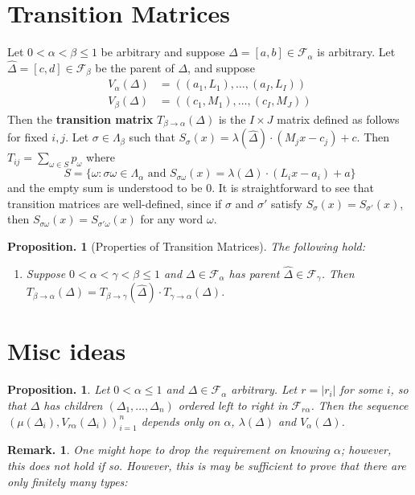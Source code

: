 \documentclass[11pt, a4paper]{memoir}
\theoremstyle{change}
\newtheorem{proposition}[theorem]{Proposition.}
\theoremstyle{plain}
\theoremstyle{nonumberplain}
\newtheorem{remark}{Remark.}
\numberwithin{equation}{section}
\begin{document}
\section{Transition Matrices}
Let $0<\alpha<\beta\leq 1$ be arbitrary and suppose $\Delta=[a,b]\in\mathcal{F}_\alpha$ is arbitrary.
Let $\widehat\Delta=[c,d]\in\mathcal{F}_\beta$ be the parent of $\Delta$, and suppose
\begin{align*}
    V_\alpha(\Delta) &= ((a_1,L_1),\ldots,(a_I,L_I))\\
    V_\beta(\Delta) &= ((c_1,M_1),\ldots,(c_I,M_J))
\end{align*}
Then the \textbf{transition matrix} $T_{\beta\to\alpha}(\Delta)$ is the $I\times J$ matrix defined as follows for fixed $i,j$.
Let $\sigma\in\Lambda_\beta$ such that $S_\sigma(x)=\lambda(\widehat\Delta)\cdot (M_jx-c_j)+c$.
Then $T_{ij}=\sum_{\omega\in S}p_\omega$ where
\begin{equation*}
    S=\{\omega:\sigma\omega\in\Lambda_\alpha\text{ and }S_{\sigma\omega}(x)=\lambda(\Delta)\cdot(L_ix-a_i)+a\}
\end{equation*}
and the empty sum is understood to be 0.
It is straightforward to see that transition matrices are well-defined, since if $\sigma$ and $\sigma'$ satisfy $S_\sigma(x)=S_{\sigma'}(x)$, then $S_{\sigma\omega}(x)=S_{\sigma'\omega}(x)$ for any word $\omega$.
\begin{proposition}[Properties of Transition Matrices]
    The following hold:
    \begin{enumerate}[nl,r]
        \item Suppose $0<\alpha<\gamma<\beta\leq 1$ and $\Delta\in\mathcal{F}_\alpha$ has parent $\widehat\Delta\in\mathcal{F}_\gamma$.
            Then $T_{\beta\to\alpha}(\Delta)=T_{\beta\to\gamma}(\widehat\Delta)\cdot T_{\gamma\to\alpha}(\Delta)$.
    \end{enumerate}
\end{proposition}
\section{Misc ideas}
\begin{proposition}
    Let $0<\alpha\leq 1$ and $\Delta\in\mathcal{F}_\alpha$ arbitrary.
    Let $r=|r_i|$ for some $i$, so that $\Delta$ has children $(\Delta_1,\ldots,\Delta_n)$ ordered left to right in $\mathcal{F}_{r\alpha}$.
    Then the sequence $(\mu(\Delta_i),V_{r\alpha}(\Delta_i))_{i=1}^n$ depends only on $\alpha$, $\lambda(\Delta)$ and $V_\alpha(\Delta)$.
\end{proposition}
\begin{remark}
    One might hope to drop the requirement on knowing $\alpha$; however, this does not hold if so.
    However, this is may be sufficient to prove that there are only finitely many types:
\end{remark}
\end{document}
